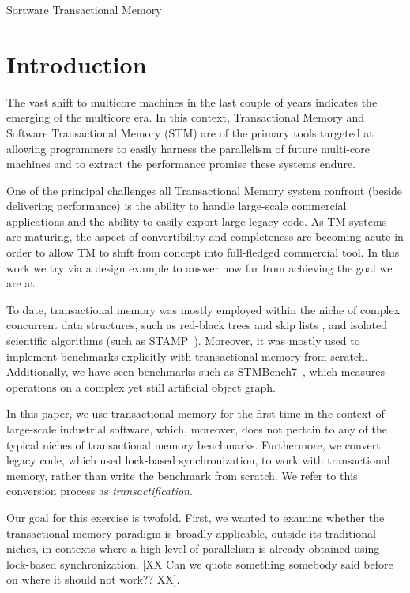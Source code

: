 \documentclass[preprint,11pt]{sigplanconf}
\let \cite = \citep
\begin{document}
\keywords
Sortware Transactional Memory

\section{Introduction}
The vast shift to multicore machines in the last couple of years indicates the 
emerging of the multicore era. In this context, Transactional Memory and Software Transactional 
Memory (STM) are of the primary tools targeted at allowing programmers to easily harness the 
parallelism of future multi-core machines and to extract the performance promise these systems 
endure. 

One of the principal challenges all Transactional Memory system confront (beside 
delivering performance) is the ability to handle large-scale commercial applications and the 
ability to easily export  large legacy code. As TM systems are maturing, the aspect of 
convertibility and completeness are becoming acute in order to allow TM to shift from concept 
into full-fledged commercial tool. In this work we try via a design example to answer how 
far from achieving the goal we are at. 

To date, transactional memory was mostly employed within the niche of complex
concurrent data structures, such as red-black trees and skip lists
\cite{herlihy:DSTM, fraser:practical:thesis:2003}, and isolated scientific
algorithms (such as STAMP~\cite{caominh:stamp:iiswc:2008}).
Moreover, it was mostly used to implement benchmarks explicitly with
transactional memory from scratch. Additionally, we have seen benchmarks such as
STMBench7~\cite{STMBench7}, which measures operations on a complex yet still
artificial object graph.

In this paper, we use transactional memory
for the first time in the context of large-scale industrial software, which,
moreover, does not pertain to any of the typical niches of transactional memory
benchmarks. Furthermore, we convert legacy code, which used lock-based
synchronization, to work with transactional memory, rather than write the
benchmark from scratch. We refer to this conversion process as
\emph{transactification}.

Our goal for this exercise is twofold. First, we wanted to examine whether the transactional 
memory paradigm is broadly applicable, outside its traditional niches, in contexts where a 
high level of parallelism is already obtained using lock-based synchronization. [XX Can we 
quote something somebody said before on where it should not work?? XX]. 
\end{document}
